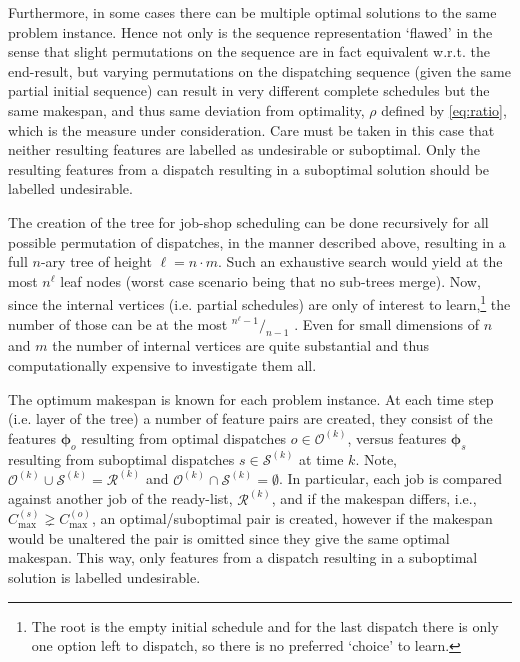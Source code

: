 \documentclass[smallextended]{llncs}
\newcommand{\vphi}{{\boldsymbol{\phi}}}
\begin{document}
Furthermore, in some cases there can be multiple optimal solutions to the same problem instance. Hence not only is the 
sequence representation `flawed' in the sense that slight permutations on the sequence are in fact equivalent w.r.t. 
the end-result, but varying permutations on the dispatching sequence (given the same partial initial sequence) can 
result in very different complete schedules but the same makespan, and thus same deviation from optimality, $\rho$ 
defined by \cref{eq:ratio}, which is the measure under consideration. Care must be taken in this case that neither 
resulting features are labelled as undesirable or suboptimal. Only the resulting features from a dispatch resulting in 
a suboptimal solution should be labelled undesirable. 

The creation of the tree for job-shop scheduling can be done recursively for all possible permutation of dispatches, 
in the manner described above, resulting in a full \mbox{$n$-ary} tree %
of height $\ell=n\cdot m$. Such an exhaustive search would yield at the most $n^{\ell}$ leaf nodes (worst case scenario being that no sub-trees merge). Now, since the internal vertices (i.e. partial schedules) are only of interest to learn,\footnote{The root is the empty initial schedule and for the last dispatch there is only one option left to dispatch, so there is no preferred `choice' to learn.} the number of those can be at the most \mbox{${}^{n^{\ell}-1}/_{n-1}$} \cite{Rosen03}.
Even for small dimensions of $n$ and $m$ the number of internal vertices are quite substantial and thus 
computationally expensive to investigate them all. 

The optimum makespan is known for each problem instance. 
At each time step (i.e. layer of the tree) a number of feature pairs are created, they consist of the features 
$\vphi_o$ resulting from optimal dispatches $o\in\mathcal{O}^{(k)}$, versus features $\vphi_s$ resulting from 
suboptimal dispatches $s\in\mathcal{S}^{(k)}$ at time $k$. Note, 
$\mathcal{O}^{(k)}\cup\mathcal{S}^{(k)}=\mathcal{R}^{(k)}$ and $\mathcal{O}^{(k)}\cap\mathcal{S}^{(k)}=\emptyset$.
In particular, each job is compared against another job of the ready-list, $\mathcal{R}^{(k)}$, and if the makespan differs, i.e., $C_{\max}^{(s)} \gneq C_{\max}^{(o)}$, an optimal/suboptimal pair is created, however if the makespan would be unaltered the pair is omitted since they give the same optimal makespan. This way, only features from a dispatch resulting in a suboptimal solution is labelled undesirable.
\end{document}
